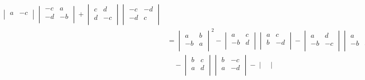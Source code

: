 \documentclass[color=black,device=normal,lang=cn,mode=geye]{elegantnote}
\begin{document}
\begin{solution}
\begin{align*}
\begin{vmatrix}
            a & -c \\
        \end{vmatrix}\begin{vmatrix}
            -c & a \\
            -d & -b \\
        \end{vmatrix}+\begin{vmatrix}
            c & d \\
            d & -c \\
        \end{vmatrix}\begin{vmatrix}
            -c & -d \\
            -d & c \\
        \end{vmatrix} \\
        & =\begin{vmatrix}
            a & b \\
            -b & a \\
        \end{vmatrix}^2-\begin{vmatrix}
            a & c \\
            -b & d \\
        \end{vmatrix}\begin{vmatrix}
            a & c \\
            b & -d \\
        \end{vmatrix}-\begin{vmatrix}
            a & d \\
            -b & -c \\
        \end{vmatrix}\begin{vmatrix}
            a & -d \\
            -b & c \\
        \end{vmatrix} \\
        & \quad-\begin{vmatrix}
            b & c \\
            a & d \\
        \end{vmatrix}\begin{vmatrix}
            b & -c \\
            a & -d \\
        \end{vmatrix}-\begin{vmatrix}

\end{vmatrix}
\end{align*}
\end{solution}
\end{document}
